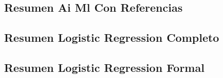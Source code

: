 \documentclass[
]{article}
\begin{document}


\subsection{Resumen Ai Ml Con
Referencias}\label{resumen-ai-ml-con-referencias}



\subsection{Resumen Logistic Regression
Completo}\label{resumen-logistic-regression-completo}



\subsection{Resumen Logistic Regression
Formal}\label{resumen-logistic-regression-formal}


\end{document}

